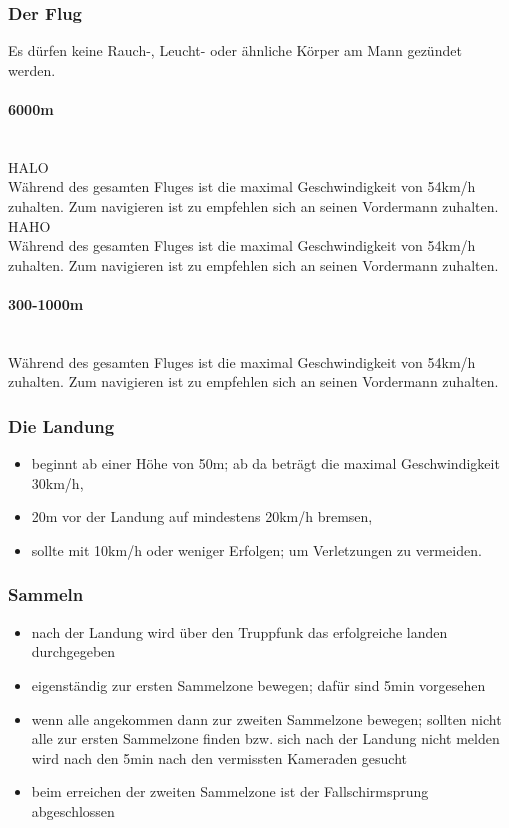 \subsubsection{Der Flug}
Es dürfen keine Rauch-, Leucht- oder ähnliche Körper am Mann gezündet werden.
\paragraph{6000m} \hfil\\
	HALO \\
	Während des gesamten Fluges ist die maximal Geschwindigkeit von 54km/h zuhalten. Zum navigieren ist zu empfehlen sich an seinen Vordermann zuhalten. \\
	HAHO \\
	Während des gesamten Fluges ist die maximal Geschwindigkeit von 54km/h zuhalten. Zum navigieren ist zu empfehlen sich an seinen Vordermann zuhalten.

\paragraph{300-1000m} \hfil\\
	Während des gesamten Fluges ist die maximal Geschwindigkeit von 54km/h zuhalten. Zum navigieren ist zu empfehlen sich an seinen Vordermann zuhalten.

\subsubsection{Die Landung}
	\begin{itemize}
		\item beginnt ab einer Höhe von 50m; ab da beträgt die maximal Geschwindigkeit 30km/h,
		\item 20m vor der Landung auf mindestens 20km/h bremsen,
		\item sollte mit 10km/h oder weniger Erfolgen; um Verletzungen zu vermeiden.
	\end{itemize}

\subsubsection{Sammeln}
	\begin{itemize}
		\item nach der Landung wird über den Truppfunk das erfolgreiche landen durchgegeben
		\item eigenständig zur ersten Sammelzone bewegen; dafür sind 5min vorgesehen
		\item wenn alle angekommen dann zur zweiten Sammelzone bewegen; sollten nicht alle zur ersten Sammelzone finden bzw. sich nach der Landung nicht melden wird nach den 5min nach den vermissten Kameraden gesucht
		\item beim erreichen der zweiten Sammelzone ist der Fallschirmsprung abgeschlossen
	\end{itemize}
	